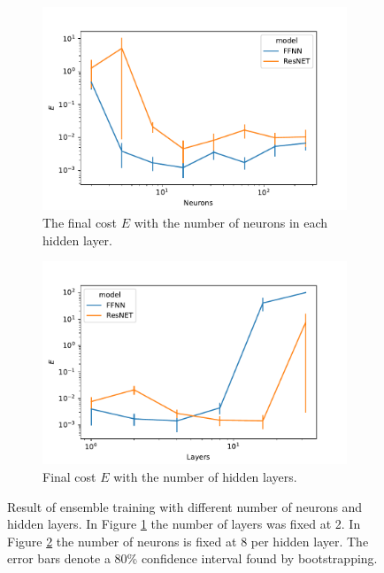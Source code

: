 \begin{figure}
    \begin{subfigure}[t]{0.5\textwidth}
        \centering
        \includegraphics[width=\linewidth]{figures/curve_1/eks_5/neurons_error.pdf}
        \caption{The final cost \(E\) with the number of neurons in each hidden layer.} \label{fig:curve_1_neuron_error} \end{subfigure}
    \begin{subfigure}[t]{0.5\textwidth}
        \centering
        \includegraphics[width=\linewidth]{figures/curve_1/eks_5/layer_error.pdf}
        \caption{Final cost \(E\) with the number of hidden layers.} \label{fig:curve_1_layer_error}
    \end{subfigure}
    \caption{Result of ensemble training with different number of neurons and hidden layers. In Figure \ref{fig:curve_1_neuron_error} the number of layers was fixed at 2. In Figure \ref{fig:curve_1_layer_error} the number of neurons is fixed at 8 per hidden layer. The error bars denote a 80\% confidence interval found by bootstrapping.} \label{fig:curve_1_parmas_eks}
\end{figure}

